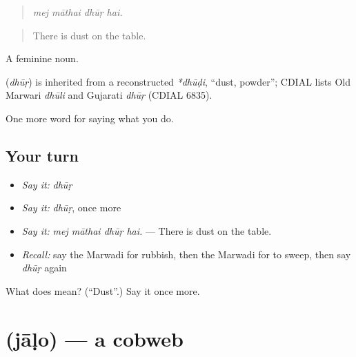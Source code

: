 \begin{quote}
   
\end{quote}

\begin{quote}
\emph{mej māthai dhūṛ hai.}
\end{quote}

\begin{quote}
There is dust on the table.
\end{quote}

A feminine noun.

\begin{cousinweb}
\textbf{} (\emph{dhūṛ}) is inherited from a reconstructed \emph{*dhūḍi}, \textquotedblleft{}dust, powder\textquotedblright{}; CDIAL lists Old Marwari \emph{dhūli} and Gujarati \emph{dhūṛ} (CDIAL 6835).
\end{cousinweb}

\begin{grammarlens}[title={What you've built}]
One more word for saying what you do.
\end{grammarlens}

\subsection*{Your turn}
\begin{itemize}
\raggedright
  \item \emph{Say it:} \emph{dhūṛ}
  \item \emph{Say it:} \emph{dhūṛ}, once more
  \item \emph{Say it:} \emph{mej māthai dhūṛ hai.} — There is dust on the table.
  \item \emph{Recall:} say the Marwadi for rubbish, then the Marwadi for to sweep, then say \emph{dhūṛ} again
\end{itemize}

\begin{tcolorbox}[breakable,colback=teal!4,colframe=teal!35!black,title={Before you move on}]
What does  mean? (\textquotedblleft{}Dust\textquotedblright{}.) Say it once more.
\end{tcolorbox}
\section[\texorpdfstring{\mw{जाळो} (jāḷo)}{जाळो (jāḷo)}]{ (jāḷo) — a cobweb}

\label{lesson:MW-C172-jalo}



